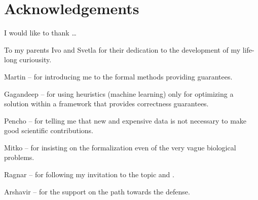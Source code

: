 
\bigskip

\begingroup
\let\clearpage\relax
\let\cleardoublepage\relax
\let\cleardoublepage\relax
\chapter*{Acknowledgements}

\def\thanks#1{%
\begingroup
\leftskip1em
\noindent #1
\par
\endgroup
}

I would like to thank \dots

To my parents Ivo and Svetla for their dedication to the development of my
life-long curiousity.

Martin -- for introducing me to the formal methods providing guarantees.

Gagandeep -- for using heuristics (machine learning) only for optimizing a
solution within a framework that provides correctness guarantees.

Pencho -- for telling me that new and expensive data is not necessary to make
good scientific contributions.

Mitko -- for insisting on the formalization even of the very vague biological
problems.

Ragnar -- for following my invitation to the topic and .

Arshavir -- for the support on the path towards the defense.


\endgroup
